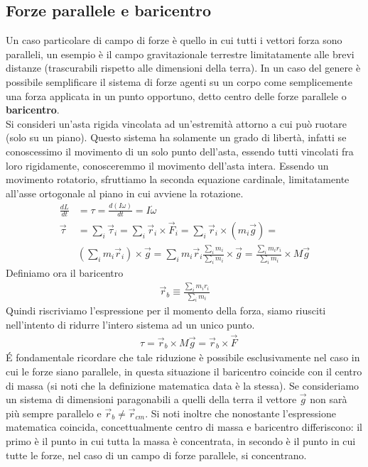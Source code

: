 \subsection{Forze parallele e baricentro}
Un caso particolare di campo di forze è quello in cui tutti i vettori forza sono paralleli, un esempio è il campo gravitazionale terrestre limitatamente alle brevi distanze (trascurabili rispetto alle dimensioni della terra). In un caso del genere è possibile semplificare il sistema di forze agenti su un corpo come semplicemente una forza applicata in un punto opportuno, detto centro delle forze parallele o \textbf{baricentro}. \\
Si consideri un'asta rigida vincolata ad un'estremità attorno a cui può ruotare (solo su un piano). Questo sistema ha solamente un grado di libertà, infatti se conoscessimo il movimento di un solo punto dell'asta, essendo tutti vincolati fra loro rigidamente, conosceremmo il movimento dell'asta intera. Essendo un movimento rotatorio, sfruttiamo la seconda equazione cardinale, limitatamente all'asse ortogonale al piano in cui avviene la rotazione.
\begin{align*}
	\frac{dL}{dt} &= \tau = \frac{d(I\omega)}{dt} = I \dot{\omega}\\
	\vec{\tau} &= \sum_i \vec{\tau}_i = \sum_i \vec{r}_i \times \vec{F}_i = \sum_i \vec{r}_i \times (m_i \vec{g}) =\\
	&(\sum_i m_i \vec{r}_i) \times \vec{g} = \sum_i m_i \vec{r}_i \frac{\sum_i m_i}{\sum_i m_i} \times \vec{g} = \frac{\sum_i m_i r_i }{\sum_i m_i} \times M \vec{g}
\end{align*}
Definiamo ora il baricentro
\begin{align*}
	\vec{r}_b \equiv \frac{\sum_i m_i r_i }{\sum_i m_i}
\end{align*}
Quindi riscriviamo l'espressione per il momento della forza, siamo riusciti nell'intento di ridurre l'intero sistema ad un unico punto. 
\begin{align*}
	&\tau = \vec{r}_b \times M \vec{g} = \vec{r}_b \times \vec{F}
\end{align*}
\'{E} fondamentale ricordare che tale riduzione è possibile esclusivamente nel caso in cui le forze siano parallele, in questa situazione il baricentro coincide con il centro di massa (si noti che la definizione matematica data è la stessa). Se consideriamo un sistema di dimensioni paragonabili a quelli della terra il vettore $\vec{g}$ non sarà più sempre parallelo e $\vec{r}_b \neq \vec{r}_{cm}$. Si noti inoltre che nonostante l'espressione matematica coincida, concettualmente centro di massa e baricentro differiscono: il primo è il punto in cui tutta la massa è concentrata, in secondo è il punto in cui tutte le forze, nel caso di un campo di forze parallele, si concentrano.
